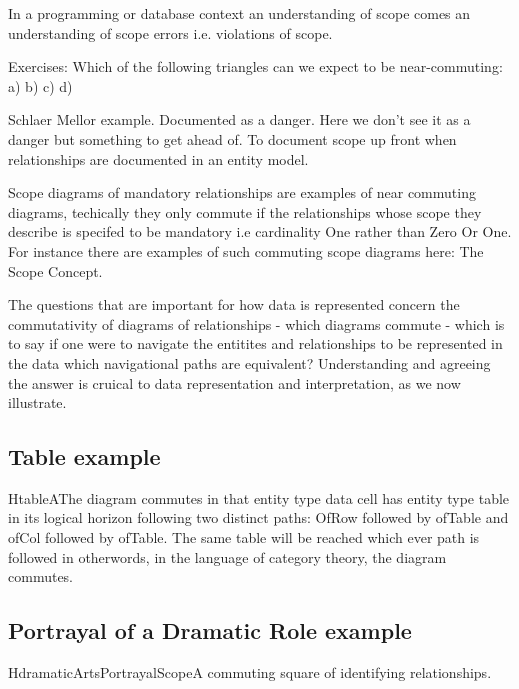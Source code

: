 In a programming or database context an understanding of scope comes an understanding of scope errors i.e. violations of scope. 

Exercises: Which of the following triangles can we expect to be near-commuting:
a) b) c) d)

\begin{noteforfuture}
Schlaer Mellor example. Documented as a danger. Here we don't see it as a danger but something to get ahead of. To document scope up front when relationships are documented in an entity model.
\end{noteforfuture}

\mynote
Scope diagrams of mandatory relationships are examples of near commuting diagrams, techically they only commute if the relationships whose scope they describe is specifed to be mandatory i.e cardinality One rather than Zero Or One. For instance there are examples of such commuting scope diagrams here: The Scope Concept.

\mynote
The questions that are important for how data is represented concern the commutativity of diagrams of relationships - which diagrams commute - which is to say if one were to navigate the entitites and relationships to be represented in the data which navigational paths are equivalent? Understanding and agreeing the answer is cruical to data representation and interpretation, as we now illustrate.

\subsection{Table example}
\begin{erboxedFigure}{H}{tableA}{The diagram commutes in that entity type data cell has entity type table in its logical horizon following two distinct paths: OfRow followed by ofTable and ofCol followed by ofTable. The same table will be reached which ever path is followed in otherwords, in the language of category theory, the diagram commutes.}

\end{erboxedFigure}

\subsection{Portrayal of a Dramatic Role example}
\begin{erboxedFigure}{H}{dramaticArtsPortrayalScope}{A commuting square of identifying relationships.}

\end{erboxedFigure}

